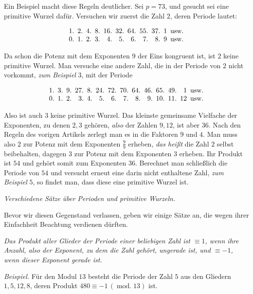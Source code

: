 Ein Beispiel macht diese Regeln deutlicher. Sei $p=73$, und gesucht sei eine primitive Wurzel dafür. Versuchen wir zuerst die Zahl $2$, deren Periode lautet:

\[\setlength{\arraycolsep}{2.5pt}\begin{array}{@{}rrrrrrrrrrl@{}}
1.&2.&4.&8.&16.&32.&64.&55.&37.&1&\text{usw.}\\
0.&1.&2.&3.&4.&5.&6.&7.&8.&9&\text{usw.}
\end{array}\]

Da schon die Potenz mit dem Exponenten $9$ der Eins kongruent ist, ist $2$ keine primitive Wurzel. Man versuche eine andere Zahl, die in der Periode von $2$ nicht vorkommt, \emph{zum Beispiel} $3$, mit der Periode

\[\setlength{\arraycolsep}{2.5pt}\begin{array}{@{}rrrrrrrrrrrrrl@{}}
1.&3.&9.&27.&8.&24.&72.&70.&64.&46.&65.&49.&1&\text{usw.}\\
0.&1.&2.&3.&4.&5.&6.&7.&8.&9.&10.&11.&12&\text{usw.}
\end{array}\]

Also ist auch $3$ keine primitive Wurzel. Das kleinste gemeinsame Vielfache der Exponenten, zu denen $2,3$ gehören, \emph{also} der Zahlen $9,12$, ist aber $36$. Nach den Regeln des vorigen Artikels zerlegt man es in die Faktoren $9$ und $4$. Man muss also $2$ zur Potenz mit dem Exponenten $\frac{9}{9}$ erheben, \emph{das heißt} die Zahl $2$ selbst beibehalten, dagegen $3$ zur Potenz mit dem Exponenten $3$ erheben. Ihr Produkt ist $54$ und gehört somit zum Exponenten $36$. Berechnet man schließlich die Periode von $54$ und versucht erneut eine darin nicht enthaltene Zahl, \emph{zum Beispiel} $5$, so findet man, dass diese eine primitive Wurzel ist.

\begin{center}\emph{Verschiedene Sätze über Perioden und primitive Wurzeln.}\end{center}

Bevor wir diesen Gegenstand verlassen, geben wir einige Sätze an, die wegen ihrer Einfachheit Beachtung verdienen dürften.

\emph{Das Produkt aller Glieder der Periode einer beliebigen Zahl ist $\equiv1$, wenn ihre Anzahl, also der Exponent, zu dem die Zahl gehört, ungerade ist, und $\equiv-1$, wenn dieser Exponent gerade ist.}

\emph{Beispiel.} Für den Modul $13$ besteht die Periode der Zahl $5$ aus den Gliedern $1,5,12,8$, deren Produkt $480\equiv-1\,(\operatorname{mod.}13)$ ist.

